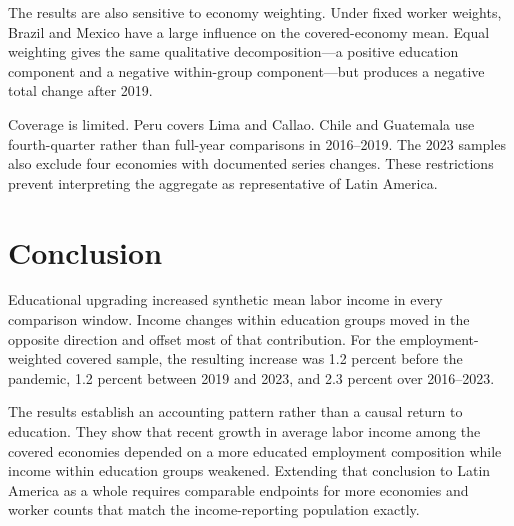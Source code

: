 \documentclass[11pt]{article}
\begin{document}
The results are also sensitive to economy weighting. Under fixed worker
weights, Brazil and Mexico have a large influence on the covered-economy mean.
Equal weighting gives the same qualitative decomposition---a positive
education component and a negative within-group component---but produces a
negative total change after 2019.

Coverage is limited. Peru covers Lima and Callao. Chile and Guatemala use
fourth-quarter rather than full-year comparisons in 2016--2019. The 2023
samples also exclude four economies with documented series changes. These
restrictions prevent interpreting the aggregate as representative of Latin
America.

\section{Conclusion}

Educational upgrading increased synthetic mean labor income in every
comparison window. Income changes within education groups moved in the
opposite direction and offset most of that contribution. For the
employment-weighted covered sample, the resulting increase was 1.2 percent
before the pandemic, 1.2 percent between 2019 and 2023, and 2.3 percent over
2016--2023.

The results establish an accounting pattern rather than a causal return to
education. They show that recent growth in average labor income among the
covered economies depended on a more educated employment composition while
income within education groups weakened. Extending that conclusion to Latin
America as a whole requires comparable endpoints for more economies and
worker counts that match the income-reporting population exactly.



\end{document}
